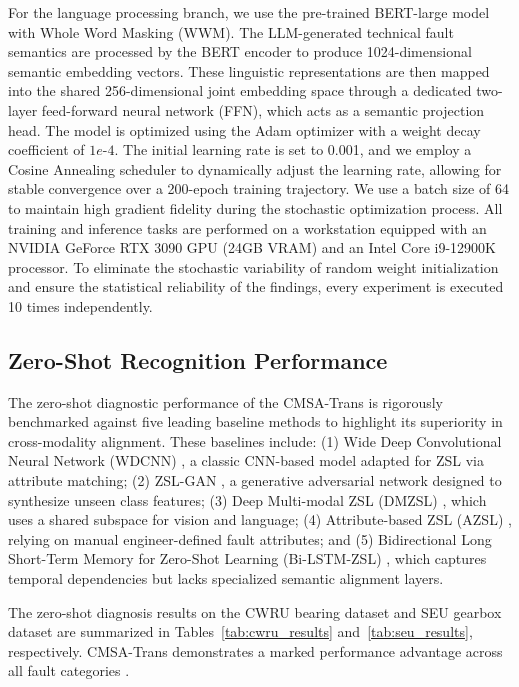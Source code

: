 \documentclass[journal]{IEEEtran}
\begin{document}
For the language processing branch, we use the pre-trained BERT-large model with Whole Word Masking (WWM). The LLM-generated technical fault semantics are processed by the BERT encoder to produce 1024-dimensional semantic embedding vectors. These linguistic representations are then mapped into the shared 256-dimensional joint embedding space through a dedicated two-layer feed-forward neural network (FFN), which acts as a semantic projection head. The model is optimized using the Adam optimizer with a weight decay coefficient of $1e$-$4$. The initial learning rate is set to 0.001, and we employ a Cosine Annealing scheduler to dynamically adjust the learning rate, allowing for stable convergence over a 200-epoch training trajectory. We use a batch size of 64 to maintain high gradient fidelity during the stochastic optimization process. All training and inference tasks are performed on a workstation equipped with an NVIDIA GeForce RTX 3090 GPU (24GB VRAM) and an Intel Core i9-12900K processor. To eliminate the stochastic variability of random weight initialization and ensure the statistical reliability of the findings, every experiment is executed 10 times independently.

\subsection{Zero-Shot Recognition Performance}

The zero-shot diagnostic performance of the CMSA-Trans is rigorously benchmarked against five leading baseline methods to highlight its superiority in cross-modality alignment. These baselines include: (1) Wide Deep Convolutional Neural Network (WDCNN) \cite{zhang2017new}, a classic CNN-based model adapted for ZSL via attribute matching; (2) ZSL-GAN \cite{xian2019fvaegan}, a generative adversarial network designed to synthesize unseen class features; (3) Deep Multi-modal ZSL (DMZSL) \cite{schonfeld2019generalized}, which uses a shared subspace for vision and language; (4) Attribute-based ZSL (AZSL) \cite{lampert2014attribute}, relying on manual engineer-defined fault attributes; and (5) Bidirectional Long Short-Term Memory for Zero-Shot Learning (Bi-LSTM-ZSL) \cite{chen2019bearing}, which captures temporal dependencies but lacks specialized semantic alignment layers.

The zero-shot diagnosis results on the CWRU bearing dataset and SEU gearbox dataset are summarized in Tables~\ref{tab:cwru_results} and~\ref{tab:seu_results}, respectively. CMSA-Trans demonstrates a marked performance advantage across all fault categories \cite{li2022zero, lu2017deep}.
\end{document}
